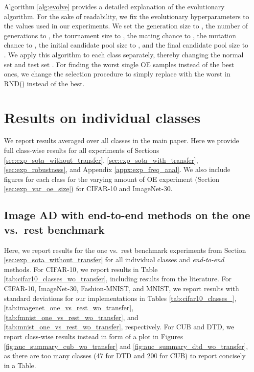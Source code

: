 \documentclass[10pt]{article} \usepackage[accepted]{stylefiles/tmlr}
\begin{document}
Algorithm \ref{alg:evolve} provides a detailed explanation of the evolutionary algorithm. 
For the sake of readability, we fix the evolutionary hyperparameters to the values used in our experiments.
We set the generation size to , the number of generations to , the tournament size to , the mating chance to , the mutation chance to , the initial candidate pool size to , and the final candidate pool size to .
We apply this algorithm to each class separately, thereby changing the normal set  and test set .
For finding the worst single OE samples instead of the best ones, we change the selection procedure to simply replace  with the worst in RND() instead of the best.



























\clearpage








\section{Results on individual classes}
\label{appx:full_results}
We report results averaged over all classes in the main paper.
Here we provide full class-wise results for all experiments of Sections \ref{sec:exp_sota_without_transfer}, \ref{sec:exp_sota_with_transfer}, \ref{sec:exp_robustness}, and Appendix \ref{appx:exp_freq_anal}. We also include figures for each class for the varying amount of OE experiment (Section \ref{sec:exp_var_oe_size}) for CIFAR-10 and ImageNet-30.




\subsection{Image AD with end-to-end methods on the one vs.~rest benchmark}
Here, we report results for the one vs.~rest benchmark experiments from Section \ref{sec:exp_sota_without_transfer} for all individual classes and \emph{end-to-end} methods. 
For CIFAR-10, we report results in Table \ref{tab:cifar10_classes_wo_transfer}, including results from the literature. 
For CIFAR-10, ImageNet-30, Fashion-MNIST, and MNIST, we report results with standard deviations for our implementations in Tables \ref{tab:cifar10_classes_}, \ref{tab:imagenet_one_vs_rest_wo_transfer}, \ref{tab:fmnist_one_vs_rest_wo_transfer}, and \ref{tab:mnist_one_vs_rest_wo_transfer}, respectively. 
For CUB and DTD, we report class-wise results instead in form of a plot in Figures \ref{fig:auc_summary_cub_wo_transfer} and \ref{fig:auc_summary_dtd_wo_transfer}, as there are too many classes (47 for DTD and 200 for CUB) to report concisely in a Table. 
\end{document}
